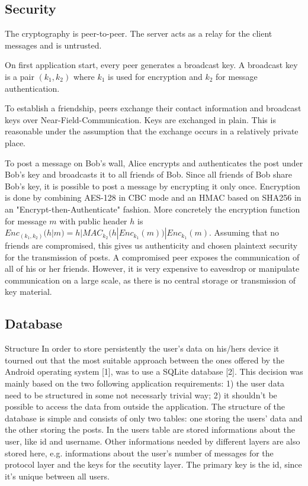 \documentclass{report}
\begin{document}
\subsection{Security}
The cryptography is peer-to-peer. The server acts as a relay for the client messages and is untrusted.

On first application start, every peer generates a broadcast key. A broadcast key is a pair $(k_1, k_2)$ where $k_1$ is used for encryption and $k_2$ for message authentication.

To establish a friendship, peers exchange their contact information and broadcast keys over Near-Field-Communication. Keys are exchanged in plain. This is reasonable under the assumption that the exchange occurs in a relatively private place.

To post a message on Bob's wall, Alice encrypts and authenticates the post under Bob's key and broadcasts it to all friends of Bob. Since all friends of Bob share Bob's key, it is possible to post a message by encrypting it only once. Encryption is done by combining AES-128 in CBC mode and an HMAC based on SHA256 in an "Encrypt-then-Authenticate" fashion. More concretely the encryption function for message $m$ with public header $h$ is \newline
$Enc_{(k_1, k_2)}(h|m) = h | MAC_{k_2}(h | Enc_{k_1}(m)) | Enc_{k_1}(m)$.
\newline
Assuming that no friends are compromised, this gives us authenticity and chosen plaintext security for the transmission of posts. A compromised peer exposes the communication of all of his or her friends. However, it is very expensive to eavesdrop or manipulate communication on a large scale, as there is no central storage or transmission of key material.

\subsection{Database}
Structure
In order to store persistently the user's data on his/hers device it tourned out that the most suitable approach between the ones offered by the Android operating system [1], was to use a SQLite database [2]. This decision was mainly based on the two following application requirements:
1) the user data need to be structured in some not necessarly trivial way;
2) it shouldn't be possible to access the data from outside the application.
The structure of the database is simple and consists of only two tables: one storing the users' data and the other storing the posts.
In the users table are stored informations about the user, like id and username. Other informations needed by different layers are also stored here, e.g. informations about the user's number of messages for the protocol layer and the keys for the secutity layer. The primary key is the id, since it's unique between all users.
\end{document}
